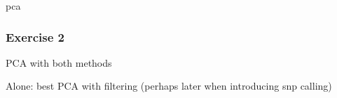 
\begin{frame}

	pca

\end{frame}


\begin{frame}
\frametitle{Exercise 2}

	PCA with both methods

	Alone: best PCA with filtering (perhaps later when introducing snp calling)

\end{frame}








